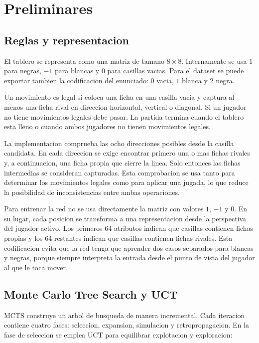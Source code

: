 \documentclass[conference,a4paper]{IEEEtran}
\begin{document}
\section{Preliminares}

\subsection{Reglas y representacion}

El tablero se representa como una matriz de tamano \(8 \times 8\). Internamente
se usa \(1\) para negras, \(-1\) para blancas y \(0\) para casillas vacias. Para
el dataset se puede exportar tambien la codificacion del enunciado:
\(0\) vacia, \(1\) blanca y \(2\) negra.

Un movimiento es legal si coloca una ficha en una casilla vacia y captura al
menos una ficha rival en direccion horizontal, vertical o diagonal. Si un
jugador no tiene movimientos legales debe pasar. La partida termina cuando el
tablero esta lleno o cuando ambos jugadores no tienen movimientos legales.

La implementacion comprueba las ocho direcciones posibles desde la casilla
candidata. En cada direccion se exige encontrar primero una o mas fichas rivales
y, a continuacion, una ficha propia que cierre la linea. Solo entonces las
fichas intermedias se consideran capturadas. Esta comprobacion se usa tanto para
determinar los movimientos legales como para aplicar una jugada, lo que reduce
la posibilidad de inconsistencias entre ambas operaciones.

Para entrenar la red no se usa directamente la matriz con valores \(1\), \(-1\)
y \(0\). En su lugar, cada posicion se transforma a una representacion desde la
perspectiva del jugador activo. Los primeros 64 atributos indican que casillas
contienen fichas propias y los 64 restantes indican que casillas contienen
fichas rivales. Esta codificacion evita que la red tenga que aprender dos casos
separados para blancas y negras, porque siempre interpreta la entrada desde el
punto de vista del jugador al que le toca mover.

\subsection{Monte Carlo Tree Search y UCT}

MCTS construye un arbol de busqueda de manera incremental. Cada iteracion
contiene cuatro fases: seleccion, expansion, simulacion y retropropagacion. En
la fase de seleccion se emplea UCT para equilibrar explotacion y exploracion:
\end{document}
